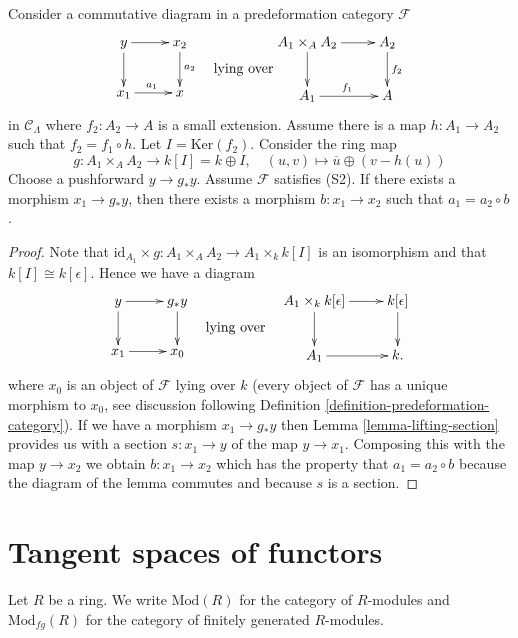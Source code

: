 \begin{lemma}
\label{lemma-lifting-along-small-extension}
Consider a commutative diagram in a predeformation category $\mathcal{F}$
$$
\vcenter{
\xymatrix{
y \ar[r] \ar[d] & x_2 \ar[d]^{a_2} \\
x_1 \ar[r]^{a_1}        & x
}
}
\quad\text{lying over}
\vcenter{
\xymatrix{
A_1 \times_A A_2 \ar[r] \ar[d] & A_2 \ar[d]^{f_2} \\
A_1 \ar[r]^{f_1} & A
}
}
$$
in $\mathcal{C}_\Lambda$ where
$f_2 : A_2 \to A$ is a small extension.
Assume there is a map $h : A_1 \to A_2$ such that $f_2 = f_1 \circ h$.
Let $I = \text{Ker}(f_2)$. Consider the ring map
$$
g : A_1 \times_A A_2 \longrightarrow k[I] = k \oplus I, \quad
(u, v) \longmapsto \overline{u} \oplus (v - h(u))
$$
Choose a pushforward $y \to g_*y$. Assume $\mathcal{F}$ satisfies (S2).
If there exists a morphism $x_1 \to g_*y$, then there exists a
morphism $b: x_1 \to x_2$ such that $a_1 =  a_2 \circ b$.
\end{lemma}

\begin{proof}
Note that
$\text{id}_{A_1} \times g : A_1 \times_A A_2 \to A_1 \times_k k[I]$
is an isomorphism and that $k[I] \cong k[\epsilon]$. Hence we have a diagram
$$
\vcenter{
\xymatrix{
y \ar[r] \ar[d] & g_*y \ar[d] \\
x_1 \ar[r]        & x_0
}
}
\quad\text{lying over}\quad
\vcenter{
\xymatrix{
A_1 \times_k k[\epsilon] \ar[r] \ar[d] & k[\epsilon] \ar[d] \\
A_1 \ar[r] & k.
}
}
$$
where $x_0$ is an object of $\mathcal{F}$ lying over $k$ (every object
of $\mathcal{F}$ has a unique morphism to $x_0$, see
discussion following Definition \ref{definition-predeformation-category}).
If we have a morphism $x_1 \to g_*y$ then
Lemma \ref{lemma-lifting-section}
provides us with a section $s : x_1 \to y$ of the map $y \to x_1$.
Composing this with the map $y \to x_2$ we obtain $b : x_1 \to x_2$
which has the property that $a_1 =  a_2 \circ b$ because
the diagram of the lemma commutes and because $s$ is a section.
\end{proof}





\section{Tangent spaces of functors}
\label{section-tangent-spaces-functors}

\noindent
Let $R$ be a ring. We write $\text{Mod}(R)$ for the category of
$R$-modules and $\text{Mod}_{fg}(R)$ for the category of finitely
generated $R$-modules.

